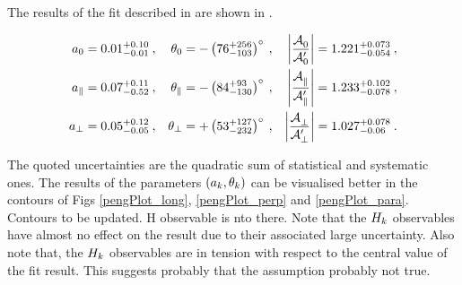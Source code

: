 The results of the \chisq fit described in  are shown in .

\begin{subequations}
\label{peng_a_theta_results}
\begin{align}
    a_{0}         & = 0.01^{+0.10}_{-0.01}\:, & \theta_{0}         & = -\left( 76^{+256}_{-103} \right)^\circ\:, &  \left| \frac{\mathcal{A}_{0}^{} }{\mathcal{A}_{0}^{\prime}} \right|          = 1.221^{+0.073}_{-0.054}\:,\\
    a_{\parallel} & = 0.07^{+0.11}_{-0.52}\:, & \theta_{\parallel} & = -\left( 84^{+93}_{-130} \right)^\circ\:,  &  \left| \frac{\mathcal{A}_{\parallel}^{} }{\mathcal{A}_{\parallel}^{\prime}} \right|  = 1.233^{+0.102}_{-0.078}\:,\\
    a_{\perp}     & = 0.05^{+0.12}_{-0.05}\:, & \theta_{\perp}     & = +\left( 53^{+127}_{-232} \right)^\circ\:, &  \left| \frac{\mathcal{A}_{\perp}^{} }{\mathcal{A}_{\perp}^{\prime}} \right|      = 1.027^{+0.078}_{-0.06}\:.
\end{align}
\end{subequations}

\noindent The quoted uncertainties are the quadratic sum of statistical and systematic ones.
The results of the parameters $(a_k,\theta_k)$ can be visualised better in the contours of
Figs \ref{pengPlot_long}, \ref{pengPlot_perp} and \ref{pengPlot_para}.{\color{red} Contours to be updated. H observable is nto there.} Note that the $H_{k}$
observables have almost no effect on the result due to their associated large uncertainty.
Also note that, the $H_{k}$ observables are in tension with respect to the central value of
the fit result. This suggests probably that the assumption  probably
not true.

